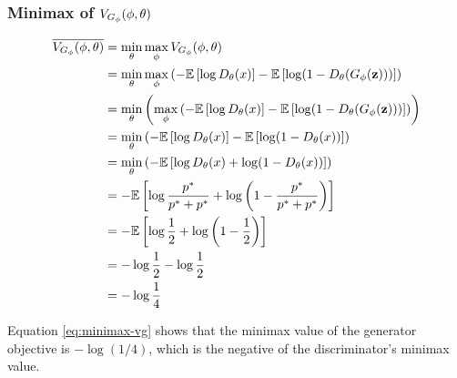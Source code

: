 \subsubsection{Minimax of $V_{G_\phi}(\phi, \theta)$}
\label{sec:minimax-vg}
\begin{align}
  \overline{V_{G_\phi}(\phi, \theta)} & = \min_{\theta}\max_{\phi} V_{G_\phi}(\phi, \theta) \nonumber \\
                  & = \min_{\theta}\max_{\mathbf{\phi}}
                    \left (-\mathbb{E}\left[\log{D_\theta(x)}\right] -
                    \mathbb{E}\left[\log(1 -
                    D_\theta(G_\phi(\mathbf{z})))\right] \right) \nonumber \\
                  & = \min_{\theta}\left(\max_{\mathbf{\phi}}
                    \left (-\mathbb{E}\left[\log{D_\theta(x)}\right] -
                    \mathbb{E}\left[\log(1 -
                    D_\theta(G_\phi(\mathbf{z})))\right] \right)
                    \right) \nonumber \\
                  & = \min_{\theta}\left(
                    -\mathbb{E}\left[\log{D_\theta(x)}\right] -
                    \mathbb{E}\left[\log(1 -
                    D_\theta(x))\right] \right) \nonumber \\
                  & = \min_{\theta}\left(
                    -\mathbb{E}\left[\log{D_\theta(x)} +
                    \log(1 - D_\theta(x))\right] \right) \nonumber \\
                  & = -\mathbb{E}\left[\log{p^*\over p^*+ p^*} +
                    \log\left(1 - {p^* \over p^* + p^*}\right)\right] \nonumber \\
                  & = - \mathbb{E}\left[\log{1 \over 2} +
                    \log{\left(1 - {1 \over 2}\right)}\right] \nonumber \\
                  & = - \log{1 \over 2} - \log{1 \over 2} \nonumber \\
                  & = - \log{1 \over 4} \label{eq:minimax-vg}
\end{align}

Equation \ref{eq:minimax-vg} shows that the minimax value of the generator objective is $-\log(1/4)$, which is the negative of the discriminator's minimax value.


